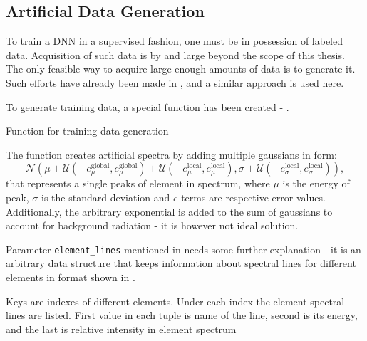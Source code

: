 \subsection{Artificial Data Generation}
To train a DNN in a supervised fashion, one must be in possession of labeled data. 
Acquisition of such data is by and large beyond the scope of this thesis. 
The only feasible way to acquire large enough amounts of data is to generate it. 
Such efforts have already been made in \cite{Jones2022}, and a similar approach is used here.

To generate training data, a special function has been created - . 

\newenvironment{longlistingD}{\captionsetup{type=listing, width=0.8\textwidth}}{}
\begin{longlistingD}
    \caption{Function for training data generation}
    \label{lst:data_generation}
\end{longlistingD}
\vspace{12pt}

The function creates artificial spectra by adding multiple gaussians in form: \[\mathcal{N}(\mu + \mathcal{U}(-e_\mu^{\text{global}}, e_\mu^{\text{global}}) + \mathcal{U}(-e_\mu^{\text{local}}, e_\mu^{\text{local}}), \sigma + \mathcal{U}(-e_\sigma^{\text{local}}, e_\sigma^{\text{local}})),\]
that represents a single peaks of element in spectrum, where $\mu$ is the energy of peak, $\sigma$ is the standard deviation and $e$ terms are respective error values. Additionally, the arbitrary exponential is added to the sum of gaussians to account for background radiation - it is however not ideal solution.

Parameter \texttt{element\_lines} mentioned in  needs some further explanation - it is an arbitrary data structure that keeps information about spectral lines for different elements in format shown in .

\newenvironment{longlistingE}{\captionsetup{type=listing, width=0.8\textwidth}}{}
\begin{longlistingE}
    \caption{Keys are indexes of different elements. Under each index the element spectral lines are listed. First value in each tuple is name of the line, second is its energy, and the last is relative intensity in element spectrum}
    \label{lst:element_lines}
\end{longlistingE}
\vspace{12pt}

